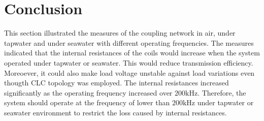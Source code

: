 \section{Conclusion}

This section illustrated the measures of the coupling network in air, under tapwater and under seawater with different operating frequencies.
The measures indicated that the internal resistances of the coils would increase when the system operated under tapwater or seawater.
This would reduce transmission efficiency.
Moreoever, it could also make load voltage unstable against load variations even thougth CLC topology was employed.
The internal resistances increased significantly as the operating frequency increased over $200\si{\kilo\hertz}$.
Therefore, the system should operate at the frequency of lower than $200\si{\kilo\hertz}$ under tapwater or seawater environment to restrict the loss caused by internal resistances.





